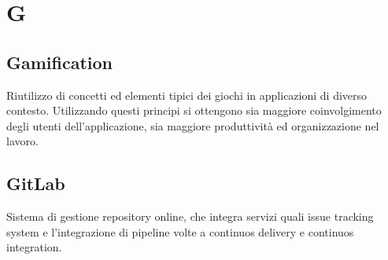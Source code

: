 \section*{G}
\subsection*{Gamification}
Riutilizzo di concetti ed elementi tipici dei giochi in applicazioni di diverso contesto. Utilizzando questi principi si ottengono sia maggiore coinvolgimento degli utenti dell'applicazione, sia maggiore produttività ed organizzazione nel lavoro.

\subsection*{GitLab}
Sistema di gestione repository online, che integra servizi quali issue tracking system e l'integrazione di pipeline volte a continuos delivery e continuos integration.

